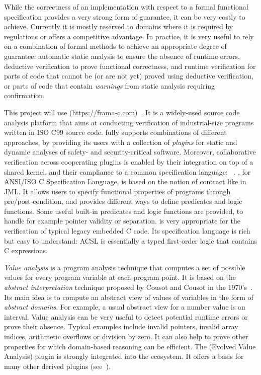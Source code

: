 While the correctness of an implementation with respect to a formal functional specification provides a very strong form of guarantee, it can be very costly to achieve.
Currently it is mostly reserved to domains where it is required by regulations or offers a competitive advantage.
In practice, it is very useful to rely on a combination of formal methods to achieve an appropriate degree of guarantee:
automatic static analysis to ensure the absence of runtime errors,
deductive verification to prove functional correctness,
and runtime verification for parts of code that cannot be (or are not yet) proved using deductive verification,
or parts of code that contain \emph{warnings} from static analysis requiring confirmation.

This project will use \framac{} (\url{https://frama-c.com})~\cite{KKP2015:FAC}.
It is a widely-used source code analysis platform that aims at conducting verification of industrial-size programs written in ISO C99 source code.
\framac{} fully supports combinations of different approaches, by providing its users with a collection of \emph{plugins} for static and dynamic analyses of safety- and security-critical software.
Moreover, collaborative verification across cooperating plugins is enabled by their integration on top of a shared kernel, and their compliance to a common specification language: \acsl~\cite{ACSL}.
\acsl, for ANSI/ISO C Specification Language, is based on the notion of contract like in JML.
It allows users to specify functional properties of programs through pre/post-condition, and provides different ways to define predicates and logic functions.
Some useful built-in predicates and logic functions are provided, to handle for example pointer validity or separation.
\framac is very appropriate for the verification of typical legacy embedded C code.
Its specification language is rich but easy to understand: ACSL is essentially a typed first-order logic that contains C expressions.

\emph{Value analysis} is a program analysis technique that computes a set of possible values for every program variable at each program point.
It is based on the \emph{abstract interpretation} technique proposed by Cousot and Cousot in the 1970's~\cite{cousot77}.
Its main idea is to compute an abstract view of values of variables in the form of \emph{abstract domains}.
For example, a usual abstract view for a number value is an interval.
Value analysis can be very useful to detect potential runtime errors or prove their absence.
Typical examples include invalid pointers, invalid array indices, arithmetic overflows or division by zero.
It can also help to prove other properties for which domain-based reasoning can be efficient.
The \Eva (Evolved Value Analysis) plugin is strongly integrated into the \framac ecosystem.
It offers a basis for many other derived plugins (see~\cite{KKP2015:FAC}).


